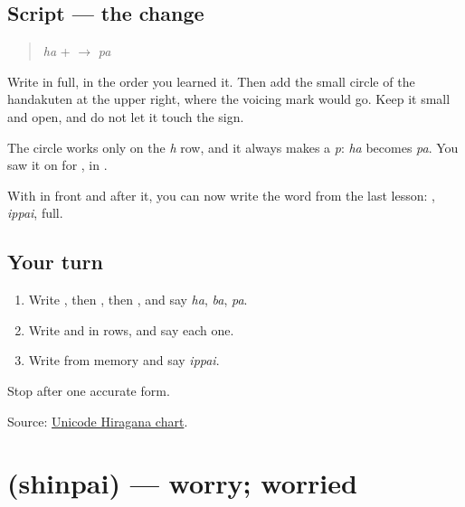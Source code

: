 \subsection*{Script — the change}

\begin{quote}
\textbf{} \emph{ha} + \textbf{} $\to$ \textbf{} \emph{pa}
\end{quote}

Write \textbf{} in full, in the order you learned it. Then add the small circle of the handakuten at the upper right, where the voicing mark would go. Keep it small and open, and do not let it touch the sign.

The circle works only on the \emph{h} row, and it always makes a \emph{p}: \emph{ha} becomes \emph{pa}. You saw it on \textbf{} for \textbf{}, in \textbf{}.

With \textbf{} in front and \textbf{} after it, you can now write the word from the last lesson: \textbf{}, \emph{ippai}, full.

\subsection*{Your turn}
\begin{enumerate}
\raggedright
  \item Write \textbf{}, then \textbf{}, then \textbf{}, and say \emph{ha}, \emph{ba}, \emph{pa}.
  \item Write \textbf{  } and \textbf{  } in rows, and say each one.
  \item Write \textbf{} from memory and say \emph{ippai}.
\end{enumerate}

\begin{tcolorbox}[breakable,colback=teal!4,colframe=teal!35!black,title={Before you move on}]
Stop after one accurate form.

Source: \href{https://www.unicode.org/charts/PDF/U3040.pdf}{Unicode Hiragana chart}.
\end{tcolorbox}
\section[\texorpdfstring{\ja{しんぱい} (shinpai)}{しんぱい (shinpai)}]{ (shinpai) — worry; worried}

